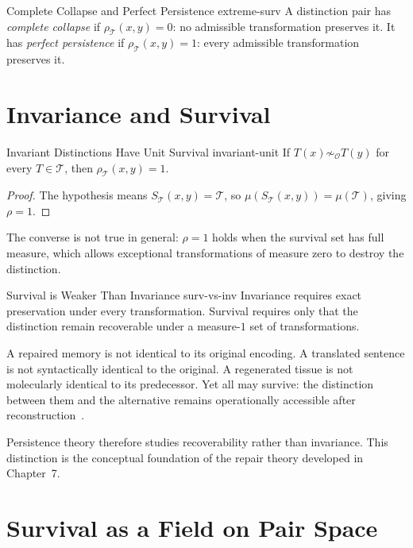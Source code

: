 \documentclass[12pt,twoside,openright]{book}
\newcommand{\transfam}{\mathcal{T}}       %
\newcommand{\obs}{\mathcal{O}}
\newcommand{\survRatio}{\rho}             %
\providecommand{\survivalSet}[1]{S_{\transfam}(#1)}
\begin{document}
\begin{definition}{Complete Collapse and Perfect Persistence}%
  {extreme-surv}
A distinction pair has \emph{complete collapse} if
$\survRatio_\transfam(x,y)=0$: no admissible transformation
preserves it. It has \emph{perfect persistence} if
$\survRatio_\transfam(x,y)=1$: every admissible transformation
preserves it.
\end{definition}

\section{Invariance and Survival}

\begin{theorem}{Invariant Distinctions Have Unit Survival}%
  {invariant-unit}
If $T(x)\not\sim_\obs T(y)$ for every $T\in\transfam$, then
$\survRatio_\transfam(x,y)=1$.
\begin{proof}
The hypothesis means $\survivalSet{x,y}=\transfam$, so
$\mu(\survivalSet{x,y})=\mu(\transfam)$, giving $\survRatio=1$.
\end{proof}
\end{theorem}

The converse is not true in general: $\survRatio=1$ holds when
the survival set has full measure, which allows exceptional
transformations of measure zero to destroy the distinction.

\begin{remark}{Survival is Weaker Than Invariance}%
  {surv-vs-inv}
Invariance requires exact preservation under every
transformation. Survival requires only that the distinction
remain recoverable under a measure-$1$ set of transformations.

A repaired memory is not identical to its original encoding.
A translated sentence is not syntactically identical to the
original. A regenerated tissue is not molecularly identical
to its predecessor. Yet all may survive: the distinction
between them and the alternative remains operationally
accessible after reconstruction~\cite{spencerbrown1969}.

Persistence theory therefore studies recoverability rather
than invariance. This distinction is the conceptual foundation
of the repair theory developed in Chapter~7.
\end{remark}

\section{Survival as a Field on Pair Space}
\end{document}
